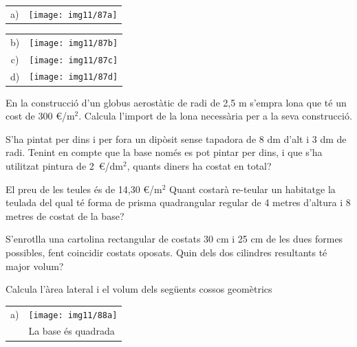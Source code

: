 \begin{activitats}
\begin{mylist}
\begin{tabular}{cc}	
a) & \texttt{[image: img11/87a]} \\
\end{tabular}


\begin{tabular}{cc}
b) & \texttt{[image: img11/87b]} \\

c) &  \texttt{[image: img11/87c]} \\

d) &  \texttt{[image: img11/87d]} \\
\end{tabular}


\exer  En la construcció d'un globus aerostàtic de radi de 2,5 m s'empra lona que té un cost de 300 \euro{}/m${}^{2}$. Calcula l'import de la lona necessària per a la seva construcció.


\exer  S'ha pintat per dins i per fora un dipòsit sense tapadora de 8 dm d'alt i 3 dm de radi. Tenint en compte que la base només es pot pintar per dins, i que s'ha utilitzat pintura de 2~\euro{}/dm${}^{2}$, quants diners ha costat en total?


\exer  El preu de les teules és de 14,30 \euro{}/m${}^{2}$ Quant costarà re-teular un habitatge la teulada del qual té forma de prisma quadrangular regular de 4 metres d'altura i 8 metres de costat de la base?


\exer  S'enrotlla una cartolina rectangular de costats 30 cm i 25 cm de les dues formes possibles, fent coincidir costats oposats. Quin dels dos cilindres resultants té major volum?


\exer  Calcula l'àrea lateral i el volum dels següents cossos geomètrics

\begin{center}
	\scriptsize
	
	\begin{tabular}{p{1cm}p{4cm}}
		
		a) & \texttt{[image: img11/88a]} \\ & La base és quadrada  \\
		

\end{tabular}
\end{center}
\end{mylist}
\end{activitats}
